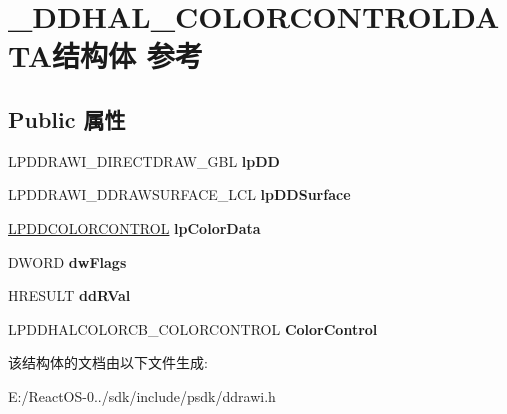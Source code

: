 \hypertarget{struct___d_d_h_a_l___c_o_l_o_r_c_o_n_t_r_o_l_d_a_t_a}{}\section{\+\_\+\+D\+D\+H\+A\+L\+\_\+\+C\+O\+L\+O\+R\+C\+O\+N\+T\+R\+O\+L\+D\+A\+T\+A结构体 参考}
\label{struct___d_d_h_a_l___c_o_l_o_r_c_o_n_t_r_o_l_d_a_t_a}
\subsection*{Public 属性}
\begin{DoxyCompactItemize}
\item 
\mbox{\label{struct___d_d_h_a_l___c_o_l_o_r_c_o_n_t_r_o_l_d_a_t_a_aa299a875e0204388c2aa3a48dd0ed13d}} 
L\+P\+D\+D\+R\+A\+W\+I\+\_\+\+D\+I\+R\+E\+C\+T\+D\+R\+A\+W\+\_\+\+G\+BL {\bfseries lp\+DD}
\item 
\mbox{\label{struct___d_d_h_a_l___c_o_l_o_r_c_o_n_t_r_o_l_d_a_t_a_a334555e10b12d04387f72a9b9503daaf}} 
L\+P\+D\+D\+R\+A\+W\+I\+\_\+\+D\+D\+R\+A\+W\+S\+U\+R\+F\+A\+C\+E\+\_\+\+L\+CL {\bfseries lp\+D\+D\+Surface}
\item 
\mbox{\label{struct___d_d_h_a_l___c_o_l_o_r_c_o_n_t_r_o_l_d_a_t_a_af3f623ba62f9ec9c0c8d5f580c8b0c9c}} 
\hyperlink{struct___d_d_c_o_l_o_r_c_o_n_t_r_o_l}{L\+P\+D\+D\+C\+O\+L\+O\+R\+C\+O\+N\+T\+R\+OL} {\bfseries lp\+Color\+Data}
\item 
\mbox{\label{struct___d_d_h_a_l___c_o_l_o_r_c_o_n_t_r_o_l_d_a_t_a_a2aa14840551741487d6a5b7af84bb78d}} 
D\+W\+O\+RD {\bfseries dw\+Flags}
\item 
\mbox{\label{struct___d_d_h_a_l___c_o_l_o_r_c_o_n_t_r_o_l_d_a_t_a_aae9c1861297d785128901f79a83de411}} 
H\+R\+E\+S\+U\+LT {\bfseries dd\+R\+Val}
\item 
\mbox{\label{struct___d_d_h_a_l___c_o_l_o_r_c_o_n_t_r_o_l_d_a_t_a_a7cbb3e327b5f428735443db1cab89831}} 
L\+P\+D\+D\+H\+A\+L\+C\+O\+L\+O\+R\+C\+B\+\_\+\+C\+O\+L\+O\+R\+C\+O\+N\+T\+R\+OL {\bfseries Color\+Control}
\end{DoxyCompactItemize}


该结构体的文档由以下文件生成\+:\begin{DoxyCompactItemize}
\item 
E\+:/\+React\+O\+S-\/0../sdk/include/psdk/ddrawi.\+h\end{DoxyCompactItemize}
